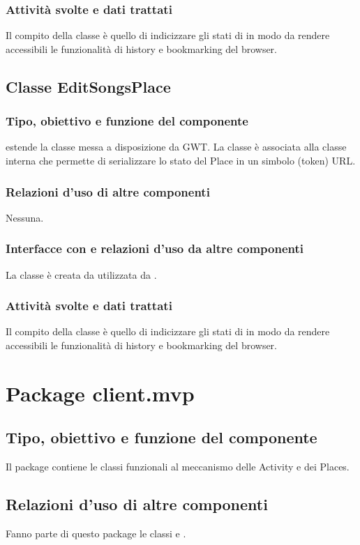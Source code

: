 \subsubsection*{Attivit\`a svolte e dati trattati}
Il compito della classe \`e quello di indicizzare gli stati di
 in modo da rendere accessibili le funzionalit\`a di
history e bookmarking del browser.

\subsection{Classe EditSongsPlace}
\subsubsection*{Tipo, obiettivo e funzione del componente}
 estende la classe  messa a disposizione da GWT. La
classe \`e associata alla classe interna  che permette di
serializzare lo stato del Place in un simbolo (token) URL.
\subsubsection*{Relazioni d'uso di altre componenti}
Nessuna.
\subsubsection*{Interfacce con e relazioni d'uso da altre componenti}
La classe \`e creata da  utilizzata da .
\subsubsection*{Attivit\`a svolte e dati trattati}
Il compito della classe \`e quello di indicizzare gli stati di
 in modo da rendere accessibili le funzionalit\`a di
history e bookmarking del browser.

\newpage
\section{Package client.mvp} %
\subsection*{Tipo, obiettivo e funzione del componente}
Il package contiene le classi funzionali al meccanismo delle Activity e dei
Places.
\subsection*{Relazioni d'uso di altre componenti}
Fanno parte di questo package le classi  e
.
